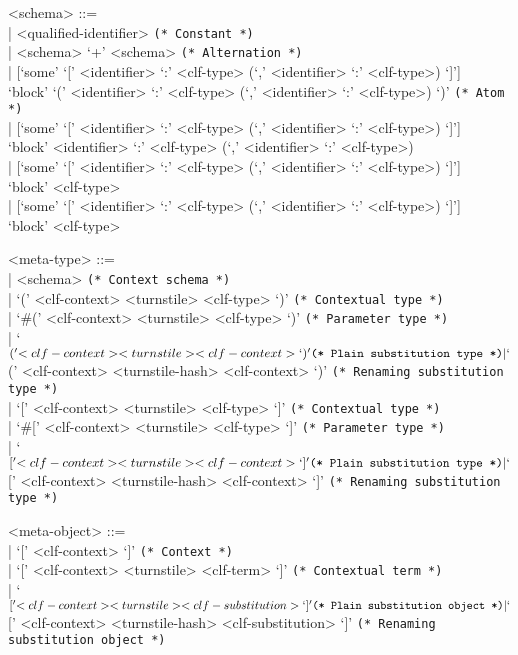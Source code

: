 \documentclass[11pt]{article}
\begin{document}
\begin{grammar}
<schema> ::= \hfill\\
| <qualified-identifier> \hfill \texttt{(* Constant *)}\\
| <schema> `+' <schema> \hfill \texttt{(* Alternation *)}\\
| [`some' `[' <identifier> `:' <clf-type> (`,' <identifier> `:' <clf-type>) `]']\\
`block' `(' <identifier> `:' <clf-type> (`,' <identifier> `:' <clf-type>) `)' \hfill \texttt{(* Atom *)}\\
| [`some' `[' <identifier> `:' <clf-type> (`,' <identifier> `:' <clf-type>) `]']\\
`block' <identifier> `:' <clf-type> (`,' <identifier> `:' <clf-type>)\\
| [`some' `[' <identifier> `:' <clf-type> (`,' <identifier> `:' <clf-type>) `]']\\
`block' <clf-type>\\
| [`some' `[' <identifier> `:' <clf-type> (`,' <identifier> `:' <clf-type>) `]']\\
`block' <clf-type>

<meta-type> ::= \hfill\\
| <schema> \hfill \texttt{(* Context schema *)}\\
| `(' <clf-context> <turnstile> <clf-type> `)' \hfill \texttt{(* Contextual type *)}\\
| `#(' <clf-context> <turnstile> <clf-type> `)' \hfill \texttt{(* Parameter type *)}\\
| `$(' <clf-context> <turnstile> <clf-context> `)' \hfill \texttt{(* Plain substitution type *)}\\
| `$(' <clf-context> <turnstile-hash> <clf-context> `)' \hfill \texttt{(* Renaming substitution type *)}\\
| `[' <clf-context> <turnstile> <clf-type> `]' \hfill \texttt{(* Contextual type *)}\\
| `#[' <clf-context> <turnstile> <clf-type> `]' \hfill \texttt{(* Parameter type *)}\\
| `$[' <clf-context> <turnstile> <clf-context> `]' \hfill \texttt{(* Plain substitution type *)}\\
| `$[' <clf-context> <turnstile-hash> <clf-context> `]' \hfill \texttt{(* Renaming substitution type *)}

<meta-object> ::= \hfill\\
| `[' <clf-context> `]' \hfill \texttt{(* Context *)}\\
| `[' <clf-context> <turnstile> <clf-term> `]' \hfill \texttt{(* Contextual term *)}\\
| `$[' <clf-context> <turnstile> <clf-substitution> `]' \hfill \texttt{(* Plain substitution object *)}\\
| `$[' <clf-context> <turnstile-hash> <clf-substitution> `]' \hfill \texttt{(* Renaming substitution object *)}


\end{grammar}
\end{document}
